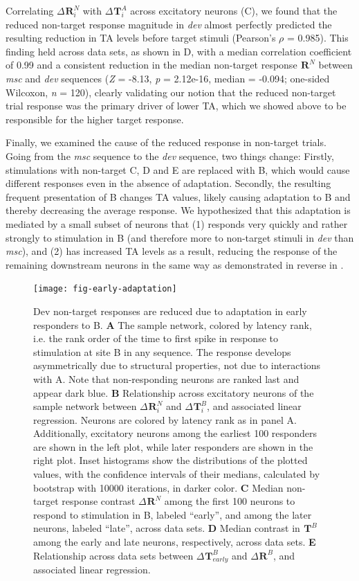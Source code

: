 \documentclass[9pt,lineno,onehalfspacing]{elife}
\newcommand{\dev}{\textit{dev}}
\newcommand{\msc}{\textit{msc}}
\newcommand{\R}[3][]{{}^{#1}_{}\boldsymbol R^{#2}_{#3}}
\newcommand{\T}[3][]{{}^{#1}_{}\boldsymbol T^{#2}_{#3}}
\begin{document}
Correlating $\Delta \R{N}{i}$ with $\Delta \T{A}{i}$ across excitatory neurons (C), we found that the reduced non-target response magnitude in \dev{} almost perfectly predicted the resulting reduction in TA levels before target stimuli (Pearson's $\rho$ = 0.985).
This finding held across data sets, as shown in D, with a median correlation coefficient of 0.99 and a consistent reduction in the median non-target response $\R{N}{}$ between \msc{} and \dev{} sequences (\textit{Z} = -8.13, \textit{p} = 2.12e-16, median = -0.094; one-sided Wilcoxon, \textit{n} = 120), clearly validating our notion that the reduced non-target trial response was the primary driver of lower TA, which we showed above to be responsible for the higher target response.

Finally, we examined the cause of the reduced response in non-target trials. Going from the \msc{} sequence to the \dev{} sequence, two things change: Firstly, stimulations with non-target C, D and E are replaced with B, which would cause different responses even in the absence of adaptation. Secondly, the resulting  frequent presentation of B changes TA values, likely causing adaptation to B and thereby decreasing the average response. We hypothesized that this adaptation is mediated by a small subset of neurons that (1) responds very quickly and rather strongly to stimulation in B (and therefore more to non-target stimuli in \dev{} than \msc{}), and (2) has increased TA levels as a result, reducing the response of the remaining downstream neurons in the same way as demonstrated in reverse in .

\begin{figure}
    \texttt{[image: fig-early-adaptation]}
    \caption{%
        Dev non-target responses are reduced due to adaptation in early responders to B.
        \textbf{A} The sample network, colored by latency rank, i.e. the rank order of the time to first spike in response to stimulation at site B in any sequence. The response develops asymmetrically due to structural properties, not due to interactions with A. Note that non-responding neurons are ranked last and appear dark blue.
        \textbf{B} Relationship across excitatory neurons of the sample network between $\Delta \R{N}{i}$ and $\Delta \T{B}{i}$, and associated linear regression. Neurons are colored by latency rank as in panel A. Additionally, excitatory neurons among the earliest 100 responders are shown in the left plot, while later responders are shown in the right plot. Inset histograms show the distributions of the plotted values, with the confidence intervals of their medians, calculated by bootstrap with 10000 iterations, in darker color.
        \textbf{C} Median non-target response contrast $\Delta \R{N}{}$ among the first 100 neurons to respond to stimulation in B, labeled ``early'', and among the later neurons, labeled ``late'', across data sets.
        \textbf{D} Median contrast in $\T{B}{}$ among the early and late neurons, respectively, across data sets.
        \textbf{E} Relationship across data sets between $\Delta \T{B}{early}$ and $\Delta \R{B}{}$, and associated linear regression.
    }
    \label{fig:early-adaptation}
\end{figure}
\end{document}
